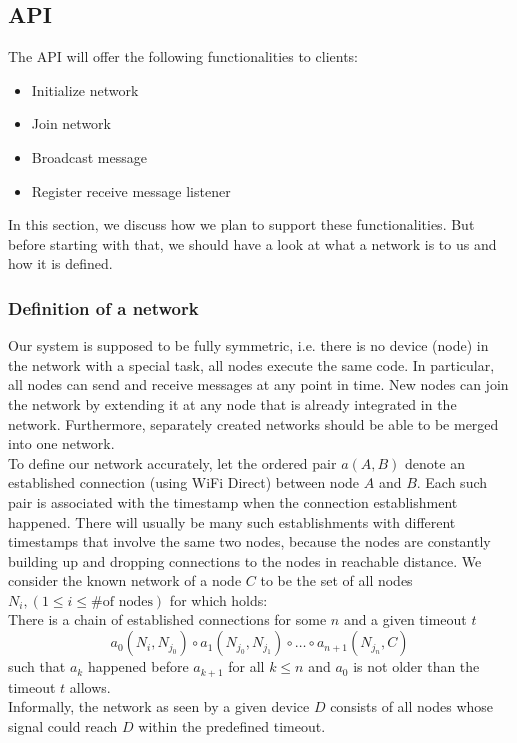 \subsection{API}
	The API will offer the following functionalities to clients:
	\begin{itemize}
		\item {Initialize network}
		\item {Join network}
		\item {Broadcast message}
		\item {Register receive message listener}
	\end{itemize}
	
	In this section, we discuss how we plan to support these functionalities. But before starting with that, we should have a look at	what a network is to us and how it is defined.\\
	\subsubsection{Definition of a network}
	Our system is supposed to be fully symmetric, i.e. there is no device (node) in the network with a special task, all nodes execute the same code. In particular, all nodes can send and receive messages at any point in time. New nodes can join the network by extending it at any node that is already integrated in the network. Furthermore, separately created networks should be able to be merged into one network.\\
	To define our network accurately, let the ordered pair $a(A,B)$ denote an established connection (using WiFi Direct) between node $A$ and $B$. Each such pair is associated with the timestamp when the connection establishment happened. There will usually be many such establishments with different timestamps that involve the same two nodes, because the nodes are constantly building up and dropping connections to the nodes in reachable distance. We consider the known network of a node $C$ to be the set of all nodes $N_i, (1 \leq i \leq \text{\# of nodes})$ for which holds:  \\
	There is a chain of established connections for some $n$ and a given timeout $t$
	\begin{displaymath}
		a_0(N_{i},N_{j_0}) \circ a_1(N_{j_0},N_{j_1}) \circ \ldots \circ a_{n+1}(N_{j_n},C)
	\end{displaymath}
	such that $a_k$ happened before $a_{k+1}$ for all $k \leq n$ and $a_0$ is not older than the timeout $t$ allows. \\
	Informally, the network as seen by a given device $D$ consists of all nodes whose signal could reach $D$ within the predefined timeout. \\ 
	
